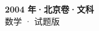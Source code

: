 \documentclass[zihao=-4, a4paper]{ctexart}
\begin{document}
\begin{center}
  {\Large\bfseries 2004 年·北京卷·文科}\\[4pt]
  {\large 数学 · 试题版}
\end{center}
\medskip
{}

\end{document}

